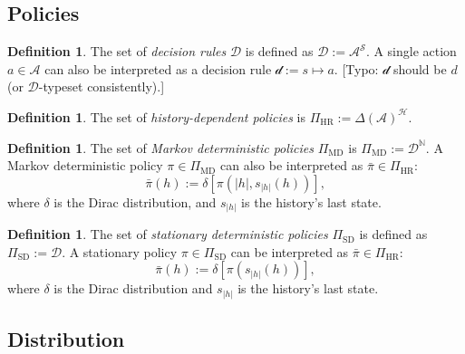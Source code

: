 \documentclass[letterpaper]{article}
\theoremstyle{plain}
\theoremstyle{definition}
\newtheorem{definition}[theorem]{Definition}
\theoremstyle{remark}
\newcommand{\Nats}{\mathbb{N}}
\newcommand{\PiHR}{\Pi_{\mathrm{HR}}}
\newcommand{\PiMD}{\Pi_{\mathrm{MD}}}
\newcommand{\cc}[1]{\textcolor{ccolor}{[#1]}}
\newcommand{\lean}[1]{\textcolor{blue}{(\emph{LEAN}: \texttt{#1})}}
\newcommand{\leanok}{}
\begin{document}
\subsection{Policies}

\begin{definition} \label{def:decision-rule}
The set of \emph{decision rules} $\mathcal{D}$ is defined as \(\mathcal{D} := \mathcal{A}^{\mathcal{S}}. \) A single action $a \in \mathcal{A}$ can also be interpreted as a decision rule $\mathcal{d} := s \mapsto a$.
\cc{Typo: $\mathcal{d}$ should be $d$ (or $\mathcal{D}$-typeset consistently).}
\end{definition}

\begin{definition} \label{def:policy-hr}
The set of \emph{history-dependent policies} is \(\PiHR :=  \Delta(\mathcal{A})^{\mathcal{H}}. \)
\end{definition}


\begin{definition} \label{def:policy-md}
The set of \emph{Markov deterministic policies} $\PiMD$ is \(\PiMD :=  \mathcal{D}^{\Nats}. \)
A Markov deterministic policy $\pi \in \PiMD$ can also be interpreted as $\bar{\pi} \in \PiHR$:
\[
  \bar{\pi}(h) := \delta \left[  \pi(|h|, s_{|h|}(h)) \right],
\]
where $\delta$ is the Dirac distribution,  and $s_{|h|}$ is the history's last state.
\end{definition}

\begin{definition} \label{def:policy-sd}
The set of \emph{stationary deterministic policies} $\Pi_{\mathrm{SD}}$ is defined as \(\Pi_{\mathrm{SD}} := \mathcal{D}. \)
A stationary policy $\pi \in \Pi_{\mathrm{SD}}$ can be interpreted as $\bar{\pi} \in \PiHR$:
\[
  \bar{\pi}(h) := \delta \left[  \pi(s_{|h|}(h)) \right],
\]
where $\delta$ is the Dirac distribution and $s_{|h|}$ is the history's last state.
\end{definition}

\subsection{Distribution}
\end{document}
